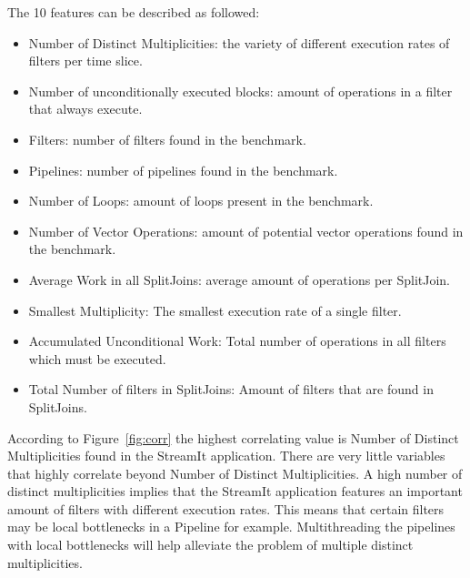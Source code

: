 The 10 features can be described as followed:
\begin{itemize}
\item Number of Distinct Multiplicities: the variety of different execution rates of filters per time slice.
\vspace{-0.5em}
\item Number of unconditionally executed blocks: amount of operations in a filter that always execute.
\vspace{-0.5em}
\item Filters: number of filters found in the benchmark.
\vspace{-0.5em}
\item Pipelines: number of pipelines found in the benchmark.
\vspace{-0.5em}
\item Number of Loops: amount of loops present in the benchmark.
\vspace{-0.5em}
\item Number of Vector Operations: amount of potential vector operations found in the benchmark.
\vspace{-0.5em}
\item Average Work in all SplitJoins: average amount of operations per SplitJoin.
\vspace{-0.5em}
\item Smallest Multiplicity: The smallest execution rate of a single filter.
\vspace{-0.5em}
\item Accumulated Unconditional Work: Total number of operations in all filters which must be executed.
\vspace{-0.5em}
\item Total Number of filters in SplitJoins: Amount of filters that are found in SplitJoins.
\end{itemize}

According to Figure~\ref{fig:corr} the highest correlating value is Number of Distinct Multiplicities found in the StreamIt application.
There are very little variables that highly correlate beyond Number of Distinct Multiplicities.
A high number of distinct multiplicities implies that the StreamIt application features an important amount of filters with different execution rates.
This means that certain filters may be local bottlenecks in a Pipeline for example.
Multithreading the pipelines with local bottlenecks will help alleviate the problem of multiple distinct multiplicities.

